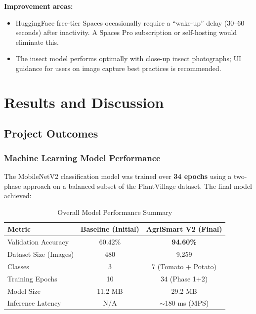 \documentclass[12pt,a4paper]{report}
\begin{document}
\textbf{Improvement areas:}
\begin{itemize}
  \item HuggingFace free-tier Spaces occasionally require a ``wake-up'' delay (30--60 seconds) after inactivity. A Spaces Pro subscription or self-hosting would eliminate this.
  \item The insect model performs optimally with close-up insect photographs; UI guidance for users on image capture best practices is recommended.
\end{itemize}

\newpage

\chapter{Results and Discussion}

\section{Project Outcomes}

\subsection{Machine Learning Model Performance}
The MobileNetV2 classification model was trained over \textbf{34 epochs} using a two-phase approach on a balanced subset of the PlantVillage dataset. The final model achieved:

\begin{table}[H]
\centering
\caption{Overall Model Performance Summary}
\begin{tabular}{lcc}
\toprule
\textbf{Metric} & \textbf{Baseline (Initial)} & \textbf{AgriSmart V2 (Final)} \\
\midrule
Validation Accuracy & 60.42\% & \textbf{94.60\%} \\
Dataset Size (Images) & 480 & 9,259 \\
Classes & 3 & 7 (Tomato + Potato) \\
Training Epochs & 10 & 34 (Phase 1+2) \\
Model Size & 11.2 MB & 29.2 MB \\
Inference Latency & N/A & $\sim$180 ms (MPS) \\
\bottomrule
\end{tabular}
\end{table}
\end{document}
